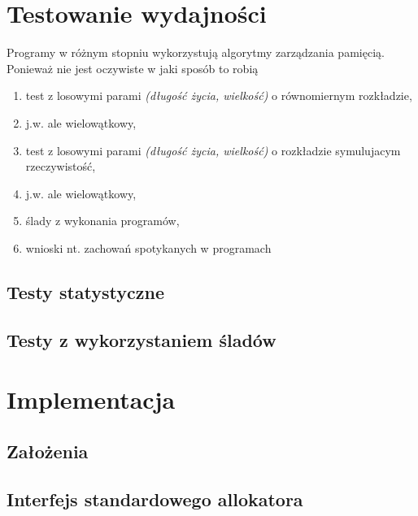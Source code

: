 \documentclass[12pt,a4paper,titlepage,twoside]{mwart}
\begin{document}
\newpage


\section{Testowanie wydajności}
\hypertarget{Testowanie}{}

Programy w różnym stopniu wykorzystują algorytmy zarządzania pamięcią. Ponieważ
nie jest oczywiste w jaki sposób to robią 




\begin{enumerate}
\item test z losowymi parami \textit{(długość życia, wielkość)} o równomiernym rozkładzie,
\item j.w. ale wielowątkowy,
\item test z losowymi parami \textit{(długość życia, wielkość)} o rozkładzie symulujacym rzeczywistość,
\item j.w. ale wielowątkowy,
\item ślady z wykonania programów,
\item wnioski nt. zachowań spotykanych w programach
\end{enumerate}

\subsection{Testy statystyczne}

\subsection{Testy z wykorzystaniem śladów}

\newpage


\section{Implementacja}
\hypertarget{Implementacja}{}

\subsection{Założenia}

\newpage

\subsection{Interfejs standardowego allokatora}
\end{document}
